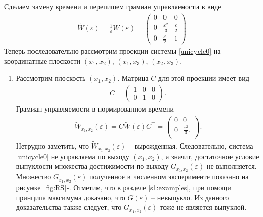 \documentclass[../main.tex]{subfiles}
\begin{document}
    Сделаем замену времени и перепишем грамиан управляемости в виде
    \begin{gather*}
        \widetilde{W}(\varepsilon) = \frac{1}{\varepsilon}W(\varepsilon)     =\begin{pmatrix}
            0 & 0 & 0 \\
            0 & \frac{\varepsilon^2}{3} & \frac{\varepsilon}{2} \\
            0 &  \frac{\varepsilon}{2} & 1
        \end{pmatrix} 
    \end{gather*} 
    Теперь последовательно рассмотрим проекции системы \eqref{unicycle0} на координатные плоскости $ (x_1, x_2) $, $ (x_1, x_3) $, $ (x_2, x_3) $. \\
    
    \begin{enumerate}
        \item Рассмотрим плоскость $ (x_1, x_2) $. Матрица $ C $ для этой проекции имеет вид
        \begin{gather*}
            C = \begin{pmatrix}
                1 & 0 & 0 \\
                0 & 1 & 0
            \end{pmatrix}.
        \end{gather*}
        Грамиан управляемости в нормированном времени
        \begin{gather*}
            \widetilde{W}_{x_1,x_2}(\varepsilon) =  C \widetilde{W} (\varepsilon) C^{\top}  =\begin{pmatrix}
                0 & 0 \\
                0 & \frac{\varepsilon^2}{3}. \\
            \end{pmatrix}.
        \end{gather*}
        Нетрудно заметить, что $ \widetilde{W}_{x_1,x_2}(\varepsilon) $ -- вырожденная. Следовательно, система \eqref{unicycle0} не управляема по выходу $ (x_1, x_2) $, а значит, достаточное условие выпуклости множества достижимости по выходу $ G_{x_1,x_2}(\varepsilon) $ не выполняется. Множество $ G_{x_1,x_2}(\varepsilon) $ полученное в численном эксперименте показано на рисунке~\ref{fig:RS}-. Отметим, что в разделе \ref{s1:examples}, при помощи принципа максимума доказано, что $ G(\varepsilon) $ -- невыпукло. Из данного доказательства также следует, что $ G_{x_1,x_2}(\varepsilon) $ тоже не является выпуклой.
        

\end{enumerate}
\end{document}
